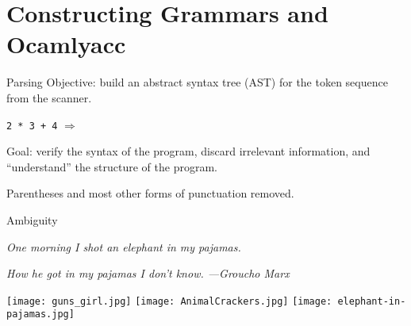 \documentclass{plt}
\def\plus#1#2{node {\texttt{+}} child {#1} child {#2}}
\def\mult#1#2{node {\texttt{*}} child {#1} child {#2}}
\def\lit#1{node {#1}}
\begin{document}
\part{Constructing Grammars and Ocamlyacc}
\frame{\partpage}

\begin{frame}{Parsing}
Objective: build an abstract syntax tree (AST) for the token sequence
from the scanner.

\begin{center}
\texttt{2 * 3 + 4} \hspace{3pc} $\Rightarrow$ \hspace{3pc}
\end{center}

\medskip

Goal: verify the syntax of the program, discard irrelevant
information, and ``understand'' the structure of the program.

Parentheses and most other forms of punctuation removed.

\end{frame}

\begin{frame}{Ambiguity}

\centerline{\emph{One morning I shot an elephant in my pajamas.}}

\pause

\centerline{\emph{How he got in my pajamas I don't know. ---Groucho Marx}}

\vfill

\texttt{[image: guns\_girl.jpg]} \hfill
\texttt{[image: AnimalCrackers.jpg]} \hfill
\texttt{[image: elephant-in-pajamas.jpg]}

\end{frame}
\end{document}
